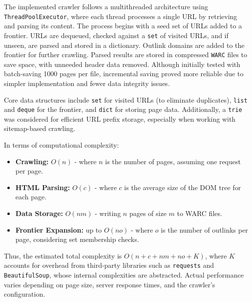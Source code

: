 The implemented crawler follows a multithreaded architecture using \texttt{ThreadPoolExecutor}, where each thread processes a single URL by retrieving and parsing its content. The process begins with a seed set of URLs added to a frontier. URLs are dequeued, checked against a \texttt{set} of visited URLs, and if unseen, are parsed and stored in a dictionary. Outlink domains are added to the frontier for further crawling. Parsed results are stored in compressed \texttt{WARC} files to save space, with unneeded header data removed. Although initially tested with batch-saving 1000 pages per file, incremental saving proved more reliable due to simpler implementation and fewer data integrity issues.

Core data structures include \texttt{set} for visited URLs (to eliminate duplicates), \texttt{list} and \texttt{deque} for the frontier, and \texttt{dict} for storing page data. Additionally, a \texttt{trie} was considered for efficient URL prefix storage, especially when working with sitemap-based crawling.

In terms of computational complexity:

\begin{itemize}
  \item \textbf{Crawling:} $O(n)$ - where $n$ is the number of pages, assuming one request per page.
  \item \textbf{HTML Parsing:} $O(c)$ - where $c$ is the average size of the DOM tree for each page.
  \item \textbf{Data Storage:} $O(nm)$ - writing $n$ pages of size $m$ to WARC files.
  \item \textbf{Frontier Expansion:} up to $O(no)$ - where $o$ is the number of outlinks per page, considering set membership checks.
\end{itemize}

Thus, the estimated total complexity is $O(n + c + nm + no + K)$, where $K$ accounts for overhead from third-party libraries such as \texttt{requests} and \texttt{BeautifulSoup}, whose internal complexities are abstracted. Actual performance varies depending on page size, server response times, and the crawler's configuration.




